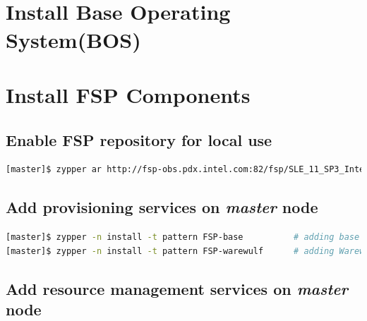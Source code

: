 \documentclass[letterpaper]{article}
\begin{document}
 \\

 \\




\section{Install Base Operating System(BOS)}



\section{Install FSP Components} \label{sec:basic_install}


\subsection{Enable FSP repository for local use}


\begin{lstlisting}[language=bash]
[master]$ zypper ar http://fsp-obs.pdx.intel.com:82/fsp/SLE_11_SP3_Intel/fsp.repo
\end{lstlisting}


\subsection{Add provisioning services on {\em master} node}


\begin{lstlisting}[language=bash,keywords={}]
[master]$ zypper -n install -t pattern FSP-base          # adding base FSP packages
[master]$ zypper -n install -t pattern FSP-warewulf      # adding Warewulf support
\end{lstlisting}

\subsection{Add resource management services on {\em master} node} \label{sec:add_rm}
\end{document}
